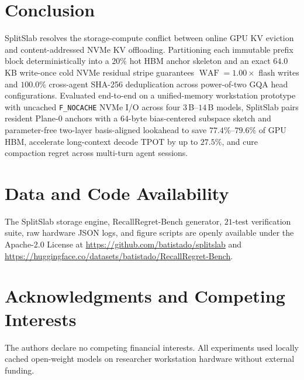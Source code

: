 \documentclass[10pt,journal,compsoc]{IEEEtran}
\theoremstyle{definition}
\theoremstyle{remark}
\newcommand{\SplitSlab}{\textup{\textsc{SplitSlab}}}
\newcommand{\RecallBench}{\textup{\textsc{RecallRegret-Bench}}}
\newcommand{\WAF}{\operatorname{WAF}}
\def\SplitSlab{SplitSlab}%
\def\RecallBench{RecallRegret-Bench}%
\begin{document}
\section{Conclusion}\label{sec:conclusion}

\SplitSlab{} resolves the storage-compute conflict between online GPU KV eviction and content-addressed NVMe KV offloading. Partitioning each immutable prefix block deterministically into a $20\%$ hot HBM anchor skeleton and an exact $64.0$\,KB write-once cold NVMe residual stripe guarantees $\WAF = 1.00\times$ flash writes and $100.0\%$ cross-agent SHA-256 deduplication across power-of-two GQA head configurations. Evaluated end-to-end on a unified-memory workstation prototype with uncached \texttt{F\_NOCACHE} NVMe I/O across four $3$\,B--$14$\,B models, \SplitSlab{} pairs resident Plane-0 anchors with a $64$-byte bias-centered subspace sketch and parameter-free two-layer basis-aligned lookahead to save $77.4\%$--$79.6\%$ of GPU HBM, accelerate long-context decode TPOT by up to $27.5\%$, and cure compaction regret across multi-turn agent sessions.

\section*{Data and Code Availability}
The \SplitSlab{} storage engine, \RecallBench{} generator, $21$-test verification suite, raw hardware JSON logs, and figure scripts are openly available under the Apache-2.0 License at \url{https://github.com/batistado/splitslab} and \url{https://huggingface.co/datasets/batistado/RecallRegret-Bench}.

\section*{Acknowledgments and Competing Interests}
The authors declare no competing financial interests. All experiments used locally cached open-weight models on researcher workstation hardware without external funding.

\appendices
\end{document}
